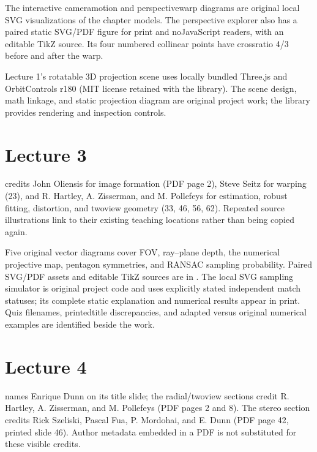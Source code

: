 \documentclass[letterpaper,11pt,english,openany,oneside]{jupyterBook}
\begin{document}
\sphinxAtStartPar
The interactive camera\sphinxhyphen{}motion and perspective\sphinxhyphen{}warp diagrams are original local SVG visualizations of the chapter models. The perspective explorer also has a paired static SVG/PDF figure for print and no\sphinxhyphen{}JavaScript readers, with an editable TikZ source. Its four numbered collinear points have cross\sphinxhyphen{}ratio 4/3 before and after the warp.

\sphinxAtStartPar
Lecture 1’s rotatable 3D projection scene uses locally bundled Three.js and OrbitControls r180 (MIT license retained with the library). The scene design, math linkage, and static projection diagram are original project work; the library provides rendering and inspection controls.


\section{Lecture 3}
\label{\detokenize{reference/credits:lecture-3}}
\sphinxAtStartPar
{} credits John Oliensis for image formation (PDF page 2), Steve Seitz for warping (23), and R. Hartley, A. Zisserman, and M. Pollefeys for estimation, robust fitting, distortion, and two\sphinxhyphen{}view geometry (33, 46, 56, 62). Repeated source illustrations link to their existing teaching locations rather than being copied again.

\sphinxAtStartPar
Five original vector diagrams cover FOV, ray–plane depth, the numerical projective map, pentagon symmetries, and RANSAC sampling probability. Paired SVG/PDF assets and editable TikZ sources are in . The local SVG sampling simulator is original project code and uses explicitly stated independent match statuses; its complete static explanation and numerical results appear in print. Quiz filenames, printed\sphinxhyphen{}title discrepancies, and adapted versus original numerical examples are identified beside the work.


\section{Lecture 4}
\label{\detokenize{reference/credits:lecture-4}}
\sphinxAtStartPar
{} names Enrique Dunn on its title slide; the radial/two\sphinxhyphen{}view sections credit R. Hartley, A. Zisserman, and M. Pollefeys (PDF pages 2 and 8). The stereo section credits Rick Szeliski, Pascal Fua, P. Mordohai, and E. Dunn (PDF page 42, printed slide 46). Author metadata embedded in a PDF is not substituted for these visible credits.
\end{document}
